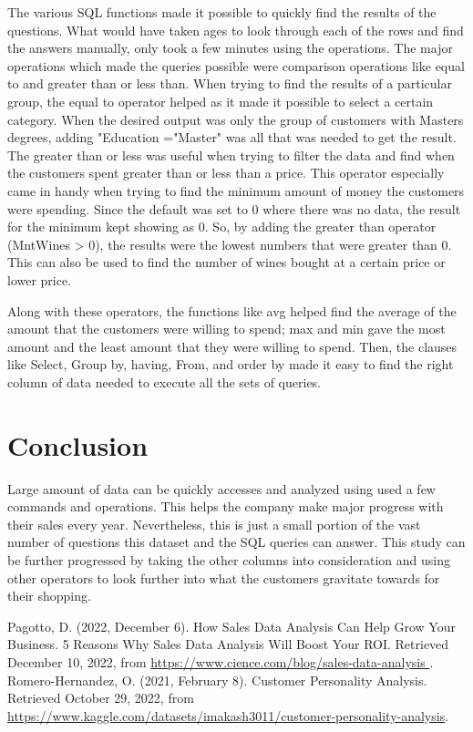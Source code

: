\documentclass{article}
\begin{document}
The various SQL functions made it possible to quickly find the results of the questions. What would have taken ages to look through each of the rows and find the answers manually, only took a few minutes using the operations. The major operations which made the queries possible were comparison operations like equal to and greater than or less than. When trying to find the results of a particular group, the equal to operator helped as it made it possible to select a certain category. When the desired output was only the group of customers with Masters degrees, adding "Education ="Master" was all that was needed to get the result. The greater than or less was useful when trying to filter the data and find when the customers spent greater than or less than a price. This operator especially came in handy when trying to find the minimum amount of money the customers were spending. Since the default was set to 0 where there was no data, the result for the minimum kept showing as 0. So, by adding the greater than operator (MntWines > 0), the results were the lowest numbers that were greater than 0. This can also be used to find the number of wines bought at a certain price or lower price. 

Along with these operators, the functions like avg helped find the average of the amount that the customers were willing to spend; max and min gave the most amount and the least amount that they were willing to spend. Then, the clauses like Select, Group by, having, From, and order by made it easy to find the right column of data needed to execute all the sets of queries. 

\section{Conclusion}
Large amount of data can be quickly accesses and analyzed using used a few commands and operations. This helps the company make major progress with their sales every year. Nevertheless, this is just a small portion of the vast number of questions this dataset and the SQL queries can answer. This study can be further progressed by taking the other columns into consideration and using other operators to look further into what the customers gravitate towards for their shopping.  




\begin{thebibliography}{1.7} 
  \color{black}Pagotto, D. (2022, December 6). How Sales Data Analysis Can Help Grow Your Business. 5 Reasons Why Sales Data Analysis Will Boost Your ROI. Retrieved December 10, 2022, from \url{https://www.cience.com/blog/sales-data-analysis }.
 \color{black}
 \color{black}Romero-Hernandez, O. (2021, February 8). Customer Personality Analysis. Retrieved October 29, 2022, from \url{https://www.kaggle.com/datasets/imakash3011/customer-personality-analysis}.
 \color{black}

\end{thebibliography}
\end{document}
